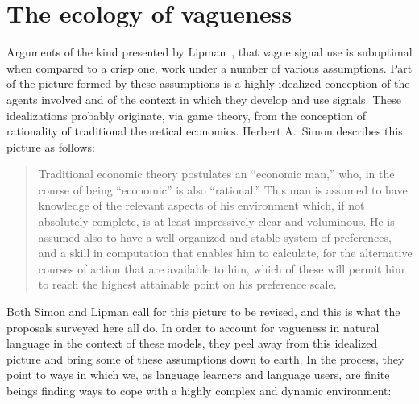 \documentclass[a4paper]{article}
\begin{document}
\section{The ecology of vagueness}
\label{sec:ecology-of-vagueness}

Arguments of the kind presented by Lipman~\parencite*{lipman_why_2009}, that vague signal use is suboptimal when compared to a crisp one, work under a number of various assumptions.
Part of the picture formed by these assumptions is a highly idealized conception of the agents involved and of the context in which they develop and use signals.
These idealizations probably originate, via game theory, from the conception of rationality of traditional theoretical economics.
Herbert A.~Simon describes this picture as follows:
\begin{quote}
Traditional economic theory postulates an ``economic man,'' who, in the course of being ``economic'' is also ``rational.''
This man is assumed to have knowledge of the relevant aspects of his environment which, if not absolutely complete, is at least impressively clear and voluminous.
He is assumed also to have a well-organized and stable system of preferences, and a skill in computation that enables him to calculate, for the alternative courses of action that are available to him, which of these will permit him to reach the highest attainable point on his preference scale.%
~\parencite[99]{simon_behavioral_1955}
\end{quote}
Both Simon and Lipman call for this picture to be revised, and this is what the proposals surveyed here all do.
In order to account for vagueness in natural language in the context of these models, they peel away from this idealized picture and bring some of these assumptions down to earth.
In the process, they point to ways in which we, as language learners and language users, are finite beings finding ways to cope with a highly complex and dynamic environment:
\end{document}
